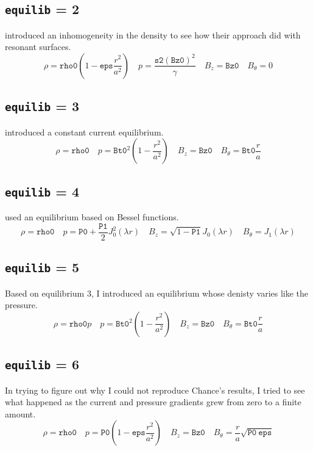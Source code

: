 \documentclass[letterpaper]{article}
\newcommand{\ttt}[1]{\texttt{#1}}
\begin{document}
\subsection{\ttt{equilib} = 2}
\citet{Appert1975} introduced an inhomogeneity in the density to see how their approach did with resonant surfaces.
\begin{equation}
\rho=\texttt{rho0} (1-\texttt{eps}\frac{r^2}{a^2}) \quad p=\frac{\texttt{s2} (\texttt{Bz0})^2}{\gamma} \quad B_z=\texttt{Bz0} \quad B_{\theta}=0 
\end{equation}

\subsection{\ttt{equilib} = 3}
\citet{Chance1977} introduced a constant current equilibrium.  
\begin{equation}
\rho=\texttt{rho0} \quad p = \texttt{Bt0}^2 \left (1-\frac{r^2}{a^2}\right ) \quad B_z = \texttt{Bz0} \quad B_{\theta}=\texttt{Bt0}\frac{r}{a}
\end{equation}

\subsection{\ttt{equilib} = 4}
\citet{Bondeson1987} used an equilibrium based on Bessel functions.
\begin{equation}
\rho=\texttt{rho0} \quad p = \texttt{P0}+\frac{\texttt{P1}}{2} J_0^2(\lambda r) \quad B_z = \sqrt{1-\texttt{P1}} J_0(\lambda r) \quad B_{\theta}=J_1(\lambda r)
\end{equation}

\subsection{\ttt{equilib} = 5}
Based on equilibrium 3, I introduced an equilibrium whose denisty varies like the pressure.
\begin{equation}
\rho=\texttt{rho0} p \quad p  = \texttt{Bt0}^2 \left (1-\frac{r^2}{a^2}\right ) \quad B_z = \texttt{Bz0} \quad B_{\theta}=\texttt{Bt0}\frac{r}{a}
\end{equation}

\subsection{\ttt{equilib} = 6}
In trying to figure out why I could not reproduce Chance's\cite{Chance1977} results, I tried to see what happened as the current and pressure gradients grew from zero to a finite amount.  
\begin{equation}
\rho=\texttt{rho0} \quad p = \texttt{P0} \left (1-\texttt{eps}\frac{r^2}{a^2} \right ) \quad B_z = \texttt{Bz0} \quad B_{\theta}=\frac{r}{a} \sqrt{\texttt{P0}\ \texttt{eps}}
\end{equation}
\end{document}
